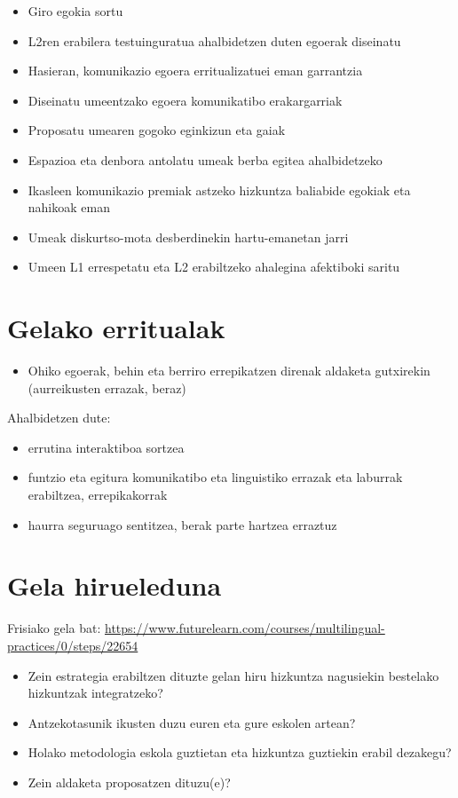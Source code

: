 \documentclass[
]{book}
\providecommand{\tightlist}{%
  \setlength{\itemsep}{0pt}\setlength{\parskip}{0pt}}
\begin{document}
\begin{itemize}
\tightlist
\item
  Giro egokia sortu
\item
  L2ren erabilera testuinguratua ahalbidetzen duten egoerak diseinatu
\item
  Hasieran, komunikazio egoera erritualizatuei eman garrantzia
\item
  Diseinatu umeentzako egoera komunikatibo erakargarriak
\item
  Proposatu umearen gogoko eginkizun eta gaiak
\item
  Espazioa eta denbora antolatu umeak berba egitea ahalbidetzeko
\item
  Ikasleen komunikazio premiak astzeko hizkuntza baliabide egokiak eta nahikoak eman
\item
  Umeak diskurtso-mota desberdinekin hartu-emanetan jarri
\item
  Umeen L1 errespetatu eta L2 erabiltzeko ahalegina afektiboki saritu
\end{itemize}

\hypertarget{gelako-erritualak}{%
\section{Gelako erritualak}\label{gelako-erritualak}}

\begin{itemize}
\tightlist
\item
  Ohiko egoerak, behin eta berriro errepikatzen direnak aldaketa gutxirekin (aurreikusten errazak, beraz)
\end{itemize}

Ahalbidetzen dute:

\begin{itemize}
\tightlist
\item
  errutina interaktiboa sortzea
\item
  funtzio eta egitura komunikatibo eta linguistiko errazak eta laburrak erabiltzea, errepikakorrak
\item
  haurra seguruago sentitzea, berak parte hartzea erraztuz
\end{itemize}

\hypertarget{gela-hirueleduna}{%
\section{Gela hirueleduna}\label{gela-hirueleduna}}

Frisiako gela bat: \url{https://www.futurelearn.com/courses/multilingual-practices/0/steps/22654}

\begin{itemize}
\tightlist
\item
  Zein estrategia erabiltzen dituzte gelan hiru hizkuntza nagusiekin bestelako hizkuntzak integratzeko?
\item
  Antzekotasunik ikusten duzu euren eta gure eskolen artean?
\item
  Holako metodologia eskola guztietan eta hizkuntza guztiekin erabil dezakegu?
\item
  Zein aldaketa proposatzen dituzu(e)?
\end{itemize}

  
\end{document}
